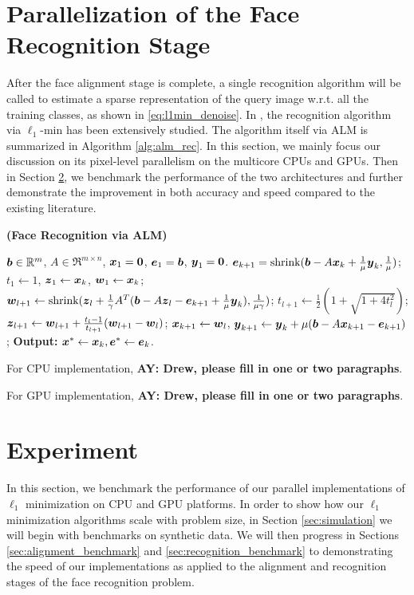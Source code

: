 \documentclass[10pt,twocolumn,letterpaper]{article}
\begin{document}
\section{Parallelization of the Face Recognition Stage}
\label{sec:recognition}
After the face alignment stage is complete, a single recognition algorithm will be called
to estimate a sparse representation of the query image w.r.t. all the training classes, 
as shown in \eqref{eq:l1min_denoise}. In \cite{WrightJ2009-PAMI,YangA2010-ICIP,WagnerA2011-PAMI},
the recognition algorithm via $\ell_1$-min has been extensively studied. The algorithm itself via ALM
is summarized in Algorithm \ref{alg:alm_rec}.
In this section, we mainly focus our discussion on its pixel-level parallelism on the multicore CPUs and GPUs. Then in Section \ref{sec:experiment}, we benchmark
the performance of the two architectures and further demonstrate the improvement in both accuracy and speed
compared to the existing literature.
\begin{algorithm}[t]
\caption{\bf (Face Recognition via ALM)} \label{alg:alm_rec} 
\begin{algorithmic}[1]
\begin{small}
 ${\boldsymbol{b}} \in {\mathbb{R}}^m$, $A \in \Re^{m \times n}$,
${\boldsymbol{x}}_1 = \boldsymbol{0}$, $\boldsymbol{e}_1 = {\boldsymbol{b}}$, $\boldsymbol{y}_1 =
\boldsymbol{0}$.
\STATE $\boldsymbol{e}_{k+1} = \textup{shrink}({\boldsymbol{b}} - A{\boldsymbol{x}}_k +
\frac{1}{\mu}\boldsymbol{y}_k, \frac{1}{\mu})$;
\STATE $t_1\leftarrow 1$, $\boldsymbol{z}_1 \leftarrow {\boldsymbol{x}}_k$, $\boldsymbol{w}_1 \leftarrow {\boldsymbol{x}}_k$;
\STATE $\boldsymbol{w}_{l+1} \leftarrow \textup{shrink}(\boldsymbol{z}_l +
\frac{1}{\gamma}A^T({\boldsymbol{b}} - A\boldsymbol{z}_l - \boldsymbol{e}_{k+1} +
\frac{1}{\mu}\boldsymbol{y}_k), \frac{1}{\mu\gamma})$;
\STATE $t_{l+1} \leftarrow \frac{1}{2}( 1 +
\sqrt{1+4t_l^2})$;
\STATE $\boldsymbol{z}_{l+1} \leftarrow \boldsymbol{w}_{l+1} + \frac{t_l - 1}{t_{l+1}}(\boldsymbol{w}_{l+1} - \boldsymbol{w}_l)$;
\ENDWHILE
\STATE ${\boldsymbol{x}}_{k+1} \leftarrow \boldsymbol{w}_{l}$,  \; $\boldsymbol{y}_{k+1} \leftarrow \boldsymbol{y}_k + \mu ({\boldsymbol{b}} - A{\boldsymbol{x}}_{k+1} - \boldsymbol{e}_{k+1})$;
\ENDWHILE \STATE
{\bf Output:} ${\boldsymbol{x}}^* \leftarrow {\boldsymbol{x}}_k, \boldsymbol{e}^* \leftarrow \boldsymbol{e}_k$.
\end{small}
\end{algorithmic}
\end{algorithm}

For CPU implementation, {\bf AY: Drew, please fill in one or two paragraphs}.

For GPU implementation, {\bf AY: Drew, please fill in one or two paragraphs}.

\section{Experiment}
\label{sec:experiment}
In this section, we benchmark the performance of our parallel implementations
of $\ell_1$ minimization on CPU and GPU platforms.  In order to show how our
$\ell_1$ minimization algorithms scale with problem size, in Section
\ref{sec:simulation} we will begin with benchmarks on synthetic data.  We will
then progress in Sections \ref{sec:alignment_benchmark} and
\ref{sec:recognition_benchmark} to demonstrating the speed of our
implementations as applied to the alignment and recognition stages of the face
recognition problem.
\end{document}
